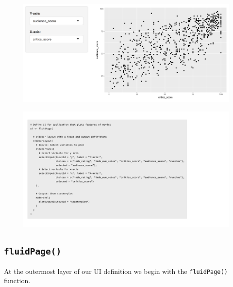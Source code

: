 \documentclass[
  letterpaper,
  DIV=11,
  numbers=noendperiod]{scrreprt}
\begin{document}
\begin{figure}

{\centering \includegraphics[width=1\textwidth,height=\textheight]{./images/app-selectinput-scatterplot.png}

}

\end{figure}

\begin{figure}

{\centering \includegraphics[width=1\textwidth,height=\textheight]{./images/ui-selectinput-scatterplot.png}

}

\end{figure}

\hypertarget{fluidpage-1}{%
\subsection{\texorpdfstring{\texttt{fluidPage()}}{fluidPage()}}\label{fluidpage-1}}

At the outermost layer of our UI definition we begin with the
\texttt{fluidPage()} function.
\end{document}
